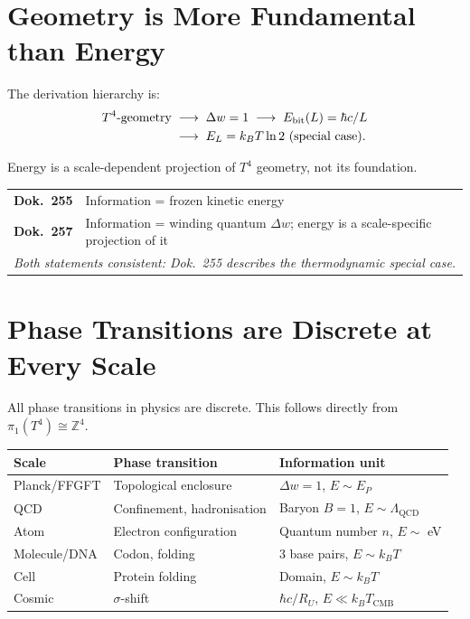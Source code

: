 \section{Geometry is More Fundamental than Energy}

The derivation hierarchy is:
\begin{align}
  T^4\text{-geometry} \;&\longrightarrow\;
  \Delta w = 1 \;\longrightarrow\;
  E_\text{bit}(L) = \hbar c / L \notag\\
  &\longrightarrow\;
  E_L = k_BT\ln 2 \text{ (special case)}.
\end{align}

Energy is a scale-dependent projection of \(T^4\) geometry,
not its foundation.

\begin{center}
\renewcommand{\arraystretch}{1.4}
\begin{tabular}{lp{8cm}}
\toprule
\textbf{Dok.~255} & Information = frozen kinetic energy \\
\textbf{Dok.~257} & Information = winding quantum \(\Delta w\);
                    energy is a scale-specific projection of it \\
\midrule
\multicolumn{2}{l}{\textit{Both statements consistent:
Dok.~255 describes the thermodynamic special case.}} \\
\bottomrule
\end{tabular}
\end{center}

\section{Phase Transitions are Discrete at Every Scale}

All phase transitions in physics are discrete.
This follows directly from \(\pi_1(T^4) \cong \mathbb{Z}^4\).

\begin{center}
\renewcommand{\arraystretch}{1.4}
\begin{tabular}{lll}
\toprule
\textbf{Scale} & \textbf{Phase transition} & \textbf{Information unit} \\
\midrule
Planck/FFGFT & Topological enclosure     & \(\Delta w=1\), \(E \sim E_P\) \\
QCD          & Confinement, hadronisation & Baryon \(B=1\), \(E\sim\Lambda_\text{QCD}\) \\
Atom         & Electron configuration    & Quantum number \(n\), \(E\sim\) eV \\
Molecule/DNA & Codon, folding            & 3 base pairs, \(E\sim k_BT\) \\
Cell         & Protein folding           & Domain, \(E\sim k_BT\) \\
Cosmic       & \(\sigma\)-shift          & \(\hbar c/R_U\), \(E \ll k_BT_\text{CMB}\) \\
\bottomrule
\end{tabular}
\end{center}

